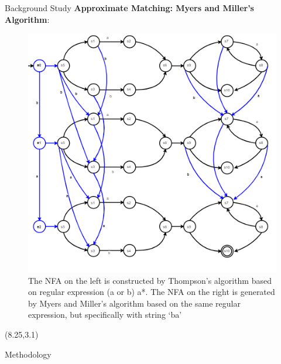 \documentclass[22pt]{beamer}
\begin{document}
\begin{frame}[fragile]
\begin{textblock}{7.25}
\begin{block}{Background Study}
\textbf{Approximate Matching: Myers and Miller's Algorithm}:


\begin{figure}
\hspace*{.2in}
\includegraphics[scale=2]{MillerAndMyersAlgorithm.PNG}
\caption{The NFA on the left is constructed by Thompson's algorithm based on regular expression (a or b) a*. The NFA on the right is generated by Myers and Miller's algorithm based on the same regular expression, but specifically with string `ba'}
\end{figure}

\end{block}
\end{textblock}


\begin{textblock}{7.25}(8.25,3.1)
\begin{block}{Methodology}


\end{block}
\end{textblock}
\end{frame}
\end{document}
